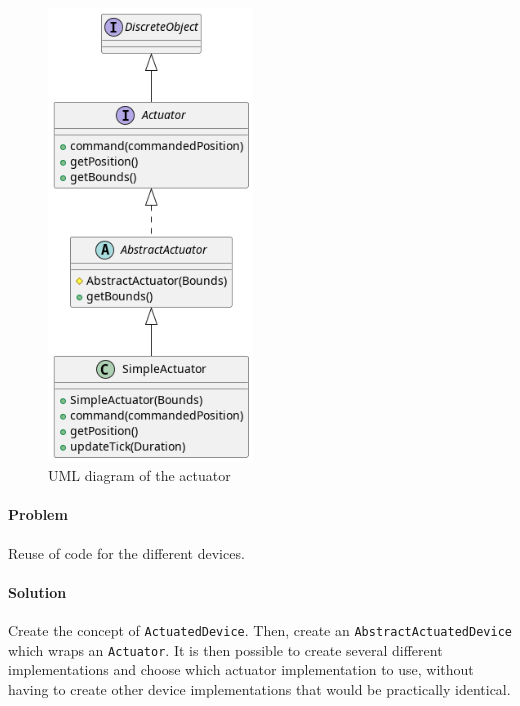 \begin{figure}[H]
\centering{}
\includegraphics[width=\textwidth,height=12cm,keepaspectratio]{magnani/uml/actuator.png}
\caption{UML diagram of the actuator}
\label{magnani:uml:actuator}
\end{figure}

\paragraph{Problem} Reuse of code for the different devices.
\paragraph{Solution} Create the concept of \texttt{ActuatedDevice}. Then, create an \texttt{AbstractActuatedDevice}
which wraps an \texttt{Actuator}.
It is then possible to create several different implementations and choose which actuator implementation to use,
without having to create other device implementations that would be practically identical.


